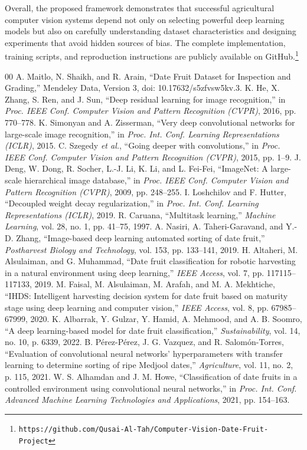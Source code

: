 \documentclass[conference]{IEEEtran}
\begin{document}
Overall, the proposed framework demonstrates that successful agricultural computer vision systems depend not only on selecting powerful deep learning models but also on carefully understanding dataset characteristics and designing experiments that avoid hidden sources of bias. The complete implementation, training scripts, and reproduction instructions are publicly available on GitHub.\footnote{\texttt{https://github.com/Qusai-Al-Tah/Computer-Vision-Date-Fruit-Project}}

\begin{thebibliography}{00}
 A. Maitlo, N. Shaikh, and R. Arain, ``Date Fruit Dataset for Inspection and Grading,'' Mendeley Data, Version 3, doi: 10.17632/s5zfvsw5kv.3.
 K. He, X. Zhang, S. Ren, and J. Sun, ``Deep residual learning for image recognition,'' in \emph{Proc. IEEE Conf. Computer Vision and Pattern Recognition (CVPR)}, 2016, pp. 770--778.
 K. Simonyan and A. Zisserman, ``Very deep convolutional networks for large-scale image recognition,'' in \emph{Proc. Int. Conf. Learning Representations (ICLR)}, 2015.
 C. Szegedy \emph{et al.}, ``Going deeper with convolutions,'' in \emph{Proc. IEEE Conf. Computer Vision and Pattern Recognition (CVPR)}, 2015, pp. 1--9.
 J. Deng, W. Dong, R. Socher, L.-J. Li, K. Li, and L. Fei-Fei, ``ImageNet: A large-scale hierarchical image database,'' in \emph{Proc. IEEE Conf. Computer Vision and Pattern Recognition (CVPR)}, 2009, pp. 248--255.
 I. Loshchilov and F. Hutter, ``Decoupled weight decay regularization,'' in \emph{Proc. Int. Conf. Learning Representations (ICLR)}, 2019.
 R. Caruana, ``Multitask learning,'' \emph{Machine Learning}, vol. 28, no. 1, pp. 41--75, 1997.
 A. Nasiri, A. Taheri-Garavand, and Y.-D. Zhang, ``Image-based deep learning automated sorting of date fruit,'' \emph{Postharvest Biology and Technology}, vol. 153, pp. 133--141, 2019.
 H. Altaheri, M. Alsulaiman, and G. Muhammad, ``Date fruit classification for robotic harvesting in a natural environment using deep learning,'' \emph{IEEE Access}, vol. 7, pp. 117115--117133, 2019.
 M. Faisal, M. Alsulaiman, M. Arafah, and M. A. Mekhtiche, ``IHDS: Intelligent harvesting decision system for date fruit based on maturity stage using deep learning and computer vision,'' \emph{IEEE Access}, vol. 8, pp. 67985--67999, 2020.
 K. Albarrak, Y. Gulzar, Y. Hamid, A. Mehmood, and A. B. Soomro, ``A deep learning-based model for date fruit classification,'' \emph{Sustainability}, vol. 14, no. 10, p. 6339, 2022.
 B. P\'{e}rez-P\'{e}rez, J. G. Vazquez, and R. Salom\'{o}n-Torres, ``Evaluation of convolutional neural networks' hyperparameters with transfer learning to determine sorting of ripe Medjool dates,'' \emph{Agriculture}, vol. 11, no. 2, p. 115, 2021.
 W. S. Alhamdan and J. M. Howe, ``Classification of date fruits in a controlled environment using convolutional neural networks,'' in \emph{Proc. Int. Conf. Advanced Machine Learning Technologies and Applications}, 2021, pp. 154--163.
\end{thebibliography}
\end{document}
